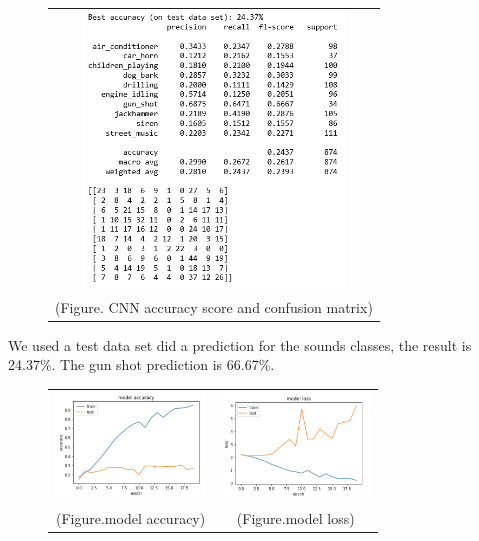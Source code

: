 \documentclass{article}
\begin{document}
\begin{figure}[!htb]
    \begin{tabular}{c}
        \includegraphics[width=7cm]{pic/CNN_Pm.png}\\
    (Figure. CNN accuracy score and confusion matrix)
    \end{tabular}
\end{figure}
We used a test data set did a prediction for the sounds classes, the result is 24.37\%. The gun shot prediction is 66.67\%.
\begin{figure}[!htb]
    \begin{tabular}{cc}
        \includegraphics[width=4cm]{pic/CNN_ACC.png}
        &\includegraphics[width=4cm]{pic/CNN_Loss.png}\\
    (Figure.model accuracy)&(Figure.model loss)
    \end{tabular}
\end{figure}
\end{document}
